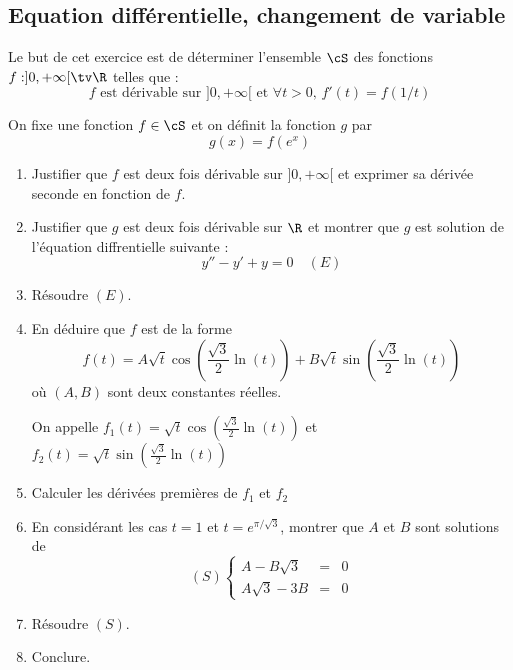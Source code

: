 \subsection{Equation différentielle, changement de variable}
\begin{exercice}
Le but de cet exercice est de déterminer l'ensemble $\cS$ des fonctions
$f :]0,+\infty[\tv \R$ telles que : 
$$ \text{$f$ est dérivable sur $]0,+\infty[$ et } \forall t>0, \, f'(t) = f(1/t)$$

On fixe une fonction $f\in \cS$ et on définit la fonction $g$ par 
$$g(x) =f(e^{x})$$
\begin{enumerate}
\item Justifier que $f$ est deux fois dérivable sur $]0,+\infty[$ et exprimer sa dérivée seconde en fonction de $f$. 
\item Justifier que $g$ est deux fois dérivable sur $\R$ et montrer que $g$ est solution de l'équation diffrentielle suivante : 
$$y''-y'+y=0\quad(E)$$
\item Résoudre $(E)$. 
\item En déduire que $f$ est de la forme $$f(t) = A \sqrt{t}  \cos\left(\frac{\sqrt{3}}{2}\ln(t)\right) +B\sqrt{t}  \sin\left(\frac{\sqrt{3}}{2}\ln(t)\right)$$ où $(A,B)$ sont deux constantes réelles.

On appelle $f_1(t) =  \sqrt{t}  \cos\left(\frac{\sqrt{3}}{2}\ln(t)\right)$ et 
$f_2(t)= \sqrt{t}  \sin\left(\frac{\sqrt{3}}{2}\ln(t)\right)$
\item Calculer les dérivées premières de $f_1$ et $f_2$
\item En considérant les cas $t=1$ et $t=e^{\pi/\sqrt{3}}$, montrer que $A$ et $B$ sont solutions de
$$(S) \left\{ \begin{array}{ccc}
A-B\sqrt{3}&=&0\\
A\sqrt{3}-3B&=&0
\end{array}\right.$$
\item Résoudre $(S)$. 
\item Conclure. 
\end{enumerate} 
\end{exercice}

